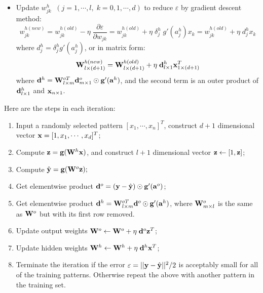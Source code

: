 \documentclass{article}
\begin{document}
\begin{itemize}
\begin{itemize}
  \item Update $w_{jk}^{h}\;\;(j=1,\cdots,l,\;k=0,1,\cdots,d)$ to reduce
    $\varepsilon$ by gradient descent method:
    \begin{equation}
      w_{jk}^{h(new)}=w_{jk}^{h(old)} -\eta\;\frac{\partial \varepsilon}{\partial w_{jk}}
      =w_{jk}^{h(old)}+\eta\;\delta_j^h\;g'(a^h_j)x_k    
      =w_{jk}^{h(old)}+\eta\;d_j^hx_k    
    \end{equation}
    where $d^h_j=\delta^h_jg'(a_j^h)$, or in matrix form:
    \begin{equation}
      {\bf W}^{h(new)}_{l\times (d+1)}={\bf W}^{h(old)}_{l\times (d+1)}
      +\eta\;{\bf d}^h_{l\times 1} {\bf x}^T_{1\times (d+1)}
    \end{equation}
    where 
    ${\bf d}^h={\bf W}^{oT}_{l\times m}{\bf d}^o_{m\times 1}\odot {\bf g}'({\bf a}^h)$, 
    and the second term is an outer product of 
    ${\bf d}^h_{l\times 1}$ and ${\bf x}_{n\times 1}$.

  \end{itemize}

\end{itemize}

Here are the steps in each iteration:

\begin{enumerate}
\item Input a randomly selected pattern $[x_1,\cdots,x_n]^T$,
  construct $d+1$ dimensional vector ${\bf x}=[1,x_1,\cdots,x_d]^T$;

\item Compute ${\bf z}={\bf g}({\bf W}^h{\bf x})$,
  and construct $l+1$ dimensional vector 
  ${\bf z} \leftarrow [1,{\bf z}]$;

\item Compute $\hat{\bf y}={\bf g}({\bf W}^o{\bf z});$

\item Get elementwise product
  ${\bf d}^o=({\bf y}-\hat{\bf y})\odot {\bf g}'({\bf a}^o)$;
  
\item Get elementwise product
  ${\bf d}^h={\bf W}^{oT}_{l\times m}{\bf d}^o \odot {\bf g}'({\bf a}^h)$,
  where ${\bf W}^o_{m\times l}$ is the same as ${\bf W}^o$ but with
  its first row removed.

\item Update output weights
  ${\bf W}^o\leftarrow {\bf W}^o+\eta\;{\bf d}^o{\bf z}^T$;

\item Update hidden weights
  ${\bf W}^h\leftarrow {\bf W}^h+\eta\;{\bf d}^h{\bf x}^T$;

\item Terminate the iteration if the error
  $\varepsilon=||{\bf y}-\hat{\bf y}||^2/2$ is acceptably small for 
  all of the training patterns. Otherwise repeat the above with 
  another pattern in the training set.
\end{enumerate}
\end{document}

